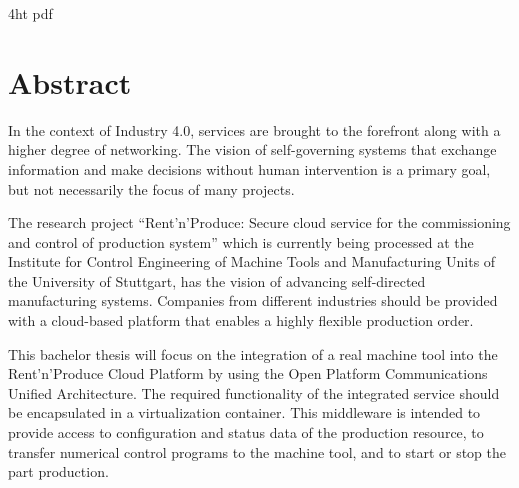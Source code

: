 \documentclass[
a4paper,
twoside,
bibliography=totoc,
headsepline,
cleardoublepage=empty,
parskip=half,
draft=false
]{scrbook}
\begin{document}
	
	\iftex4ht
	\Configure{$}{\PicMath}{\EndPicMath}{}
	{pdf}
	{%
	}
	\fi
	
	
	
	
	
	\Titelblatt
	
	\pagestyle{preamble}
	\renewcommand*{\chapterpagestyle}{preamble}
	
	\section*{Abstract}
	
		In the context of Industry 4.0, services are brought to the forefront along with a higher degree of networking. 
		The vision of self-governing systems that exchange information and make decisions without human intervention is a primary goal, but not necessarily the focus of many projects. 
		
		The research project ``Rent'n'Produce: Secure cloud service for the commissioning and control of production system'' which is currently being processed at the Institute for Control Engineering of Machine Tools and Manufacturing Units of the University of Stuttgart, has the vision of advancing self-directed manufacturing systems. 
		Companies from different industries should be provided with a cloud-based platform that enables a highly flexible production order. 
		
		This bachelor thesis will focus on the integration of a real machine tool into the Rent'n'Produce Cloud Platform by using the Open Platform Communications Unified Architecture. 
		The required functionality of the integrated service should be encapsulated in a virtualization container. 
		This middleware is intended to provide access to configuration and status data of the production resource, to transfer numerical control programs to the machine tool, and to start or stop the part production.
		
\end{document}
